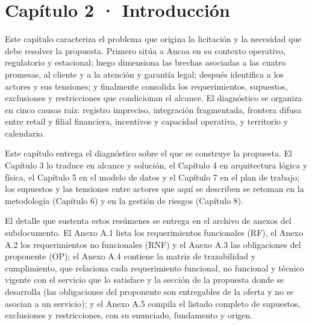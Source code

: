 \documentclass[11pt]{article}
\begin{document}
\renewcommand{\tablename}{Tabla}
\renewcommand{\figurename}{Figura}
\renewcommand{\thetable}{\arabic{table}}
\renewcommand{\thefigure}{\arabic{figure}}

\tableofcontents
\clearpage
\renewcommand{\listfigurename}{Lista de figuras}
\listoffigures
\clearpage
\renewcommand{\listtablename}{Lista de tablas}
\listoftables
\clearpage

\section{Capítulo 2 · Introducción}\label{capitulo-2-introduccion}

Este capítulo caracteriza el problema que origina la licitación y la necesidad que debe resolver la propuesta. Primero sitúa a Ancoa en su contexto operativo, regulatorio y estacional; luego dimensiona las brechas asociadas a las cuatro promesas, al cliente y a la atención y garantía legal; después identifica a los actores y sus tensiones; y finalmente consolida los requerimientos, supuestos, exclusiones y restricciones que condicionan el alcance. El diagnóstico se organiza en cinco causas raíz: registro impreciso, integración fragmentada, frontera difusa entre retail y filial financiera, incentivos y capacidad operativa, y territorio y calendario.

Este capítulo entrega el diagnóstico sobre el que se construye la propuesta. El Capítulo 3 lo traduce en alcance y solución, el Capítulo 4 en arquitectura lógica y física, el Capítulo 5 en el modelo de datos y el Capítulo 7 en el plan de trabajo; los supuestos y las tensiones entre actores que aquí se describen se retoman en la metodología (Capítulo 6) y en la gestión de riesgos (Capítulo 8).

El detalle que sustenta estos resúmenes se entrega en el archivo de anexos del subdocumento. El Anexo A.1 lista los requerimientos funcionales (RF), el Anexo A.2 los requerimientos no funcionales (RNF) y el Anexo A.3 las obligaciones del proponente (OP); el Anexo A.4 contiene la matriz de trazabilidad y cumplimiento, que relaciona cada requerimiento funcional, no funcional y técnico vigente con el servicio que lo satisface y la sección de la propuesta donde se desarrolla (las obligaciones del proponente son entregables de la oferta y no se asocian a un servicio); y el Anexo A.5 compila el listado completo de supuestos, exclusiones y restricciones, con su enunciado, fundamento y origen.
\end{document}
